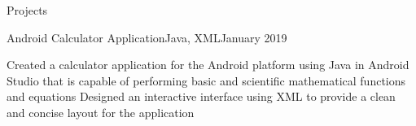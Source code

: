 \documentclass[fontsize=11pt,fontface=cormorantgaramond,fitpage]{cvtemplate}
\begin{document}
\begin{cvtext}
\begin{cvsection}{Projects}
\begin{cvsubsection}
  \end{cvsubsection}


  \begin{cvsubsection}
    {Android Calculator Application}{Java, XML}{January 2019}{}

    \listitem Created a calculator application for the Android platform using Java in Android Studio that is capable of performing basic and scientific mathematical functions and equations
    \listitem Designed an interactive interface using XML to provide a clean and concise layout for the application

  \end{cvsubsection}


\end{cvsection}


\end{cvtext}
\end{document}

